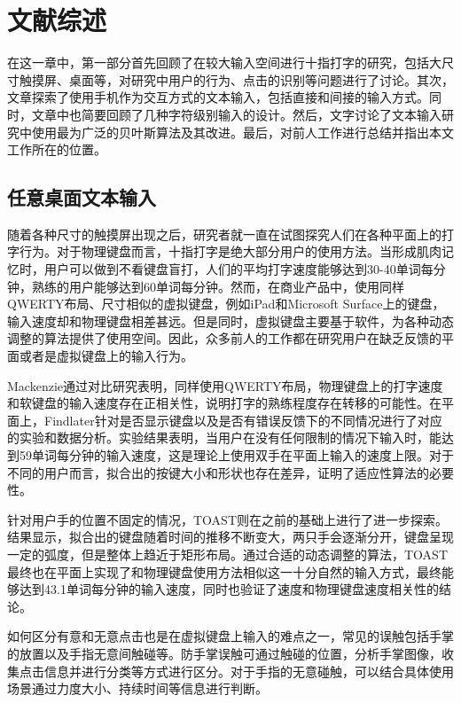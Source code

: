 \chapter{文献综述}
\label{cha:literature}
在这一章中，第一部分首先回顾了在较大输入空间进行十指打字的研究，包括大尺寸触摸屏、桌面等，对研究中用户的行为、点击的识别等问题进行了讨论。其次，文章探索了使用手机作为交互方式的文本输入，包括直接和间接的输入方式。同时，文章中也简要回顾了几种字符级别输入的设计。然后，文字讨论了文本输入研究中使用最为广泛的贝叶斯算法及其改进。最后，对前人工作进行总结并指出本文工作所在的位置。

\section{任意桌面文本输入} %
随着各种尺寸的触摸屏出现之后，研究者就一直在试图探究人们在各种平面上的打字行为。对于物理键盘而言，十指打字是绝大部分用户的使用方法。当形成肌肉记忆时，用户可以做到不看键盘盲打，人们的平均打字速度能够达到30-40单词每分钟，熟练的用户能够达到60单词每分钟\cite{flatglass2011findlater}。然而，在商业产品中，使用同样QWERTY布局、尺寸相似的虚拟键盘，例如iPad和Microsoft Surface上的键盘，输入速度却和物理键盘相差甚远。但是同时，虚拟键盘主要基于软件，为各种动态调整的算法提供了使用空间。因此，众多前人的工作都在研究用户在缺乏反馈的平面或者是虚拟键盘上的输入行为。

Mackenzie通过对比研究表明\cite{mackenzie2001empirical}，同样使用QWERTY布局，物理键盘上的打字速度和软键盘的输入速度存在正相关性，说明打字的熟练程度存在转移的可能性。在平面上，Findlater针对是否显示键盘以及是否有错误反馈下的不同情况进行了对应的实验和数据分析\cite{flatglass2011findlater}。实验结果表明，当用户在没有任何限制的情况下输入时，能达到59单词每分钟的输入速度，这是理论上使用双手在平面上输入的速度上限。对于不同的用户而言，拟合出的按键大小和形状也存在差异，证明了适应性算法的必要性。

针对用户手的位置不固定的情况，TOAST\cite{2018shitoast}则在之前的基础上进行了进一步探索。结果显示，拟合出的键盘随着时间的推移不断变大，两只手会逐渐分开，键盘呈现一定的弧度，但是整体上趋近于矩形布局。通过合适的动态调整的算法，TOAST\cite{2018shitoast}最终也在平面上实现了和物理键盘使用方法相似这一十分自然的输入方式，最终能够达到43.1单词每分钟的输入速度，同时也验证了速度和物理键盘速度相关性的结论\cite{mackenzie2001empirical}。


如何区分有意和无意点击也是在虚拟键盘上输入的难点之一，常见的误触包括手掌的放置以及手指无意间触碰等。防手掌误触可通过触碰的位置\cite{2018shitoast}，分析手掌图像\cite{ewerling2012finger}，收集点击信息并进行分类\cite{schwarz2014probabilistic}等方式进行区分。对于手指的无意碰触，可以结合具体使用场景通过力度大小、持续时间等信息进行判断。

